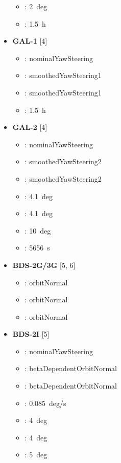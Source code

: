 \begin{itemize}
\begin{itemize}
  \item {}: 2~deg
  \item {}: 1.5~h
\end{itemize}
\item \textbf{GAL-1} [4]
\begin{itemize}
  \item {}: nominalYawSteering
  \item {}: smoothedYawSteering1
  \item {}: smoothedYawSteering1
  \item {}: 1.5~h
\end{itemize}
\item \textbf{GAL-2} [4]
\begin{itemize}
  \item {}: nominalYawSteering
  \item {}: smoothedYawSteering2
  \item {}: smoothedYawSteering2
  \item {}: 4.1~deg
  \item {}: 4.1~deg
  \item {}: 10~deg
  \item {}: 5656~s
\end{itemize}
\item \textbf{BDS-2G/3G} [5, 6]
\begin{itemize}
  \item {}: orbitNormal
  \item {}: orbitNormal
  \item {}: orbitNormal
\end{itemize}
\item \textbf{BDS-2I} [5]
\begin{itemize}
  \item {}: nominalYawSteering
  \item {}: betaDependentOrbitNormal
  \item {}: betaDependentOrbitNormal
  \item {}: 0.085~deg/s
  \item {}: 4~deg
  \item {}: 4~deg
  \item {}: 5~deg

\end{itemize}
\end{itemize}

